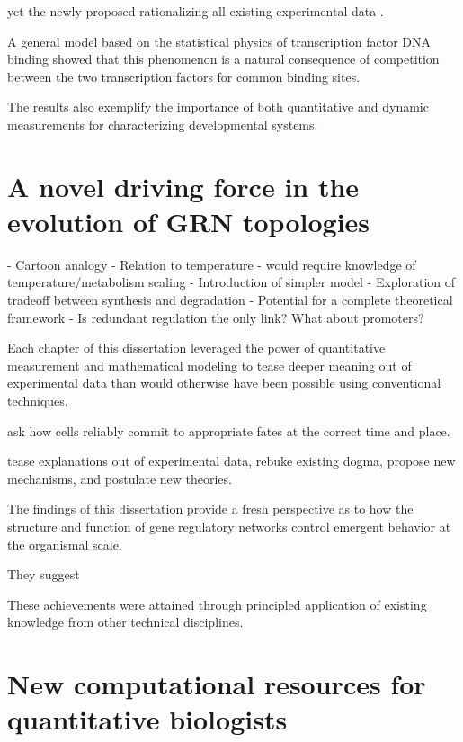 yet the newly proposed rationalizing all existing experimental data \cite{Shwartz2013,BoisclairLachance2014,Pelaez2015a}.

A general model based on the statistical physics of transcription factor DNA binding showed that this phenomenon is a natural consequence of competition between the two transcription factors for common binding sites. 

The results also exemplify the importance of both quantitative and dynamic measurements for characterizing developmental systems. 










\section{ A novel driving force in the evolution of GRN topologies }

- Cartoon analogy
- Relation to temperature - would require knowledge of temperature/metabolism scaling
- Introduction of simpler model
- Exploration of tradeoff between synthesis and degradation
- Potential for a complete theoretical framework
- Is redundant regulation the only link? What about promoters?





Each chapter of this dissertation leveraged the power of quantitative measurement and mathematical modeling to tease deeper meaning out of experimental data than would otherwise have been possible using conventional techniques.

ask how cells reliably commit to appropriate fates at the correct time and place.

tease explanations out of experimental data, rebuke existing dogma, propose new mechanisms, and postulate new theories. 

The findings of this dissertation provide a fresh perspective as to how the structure and function of gene regulatory networks control emergent behavior at the organismal scale.

They suggest 

These achievements were attained through principled application of existing knowledge from other technical disciplines.







\section{New computational resources for quantitative biologists}

